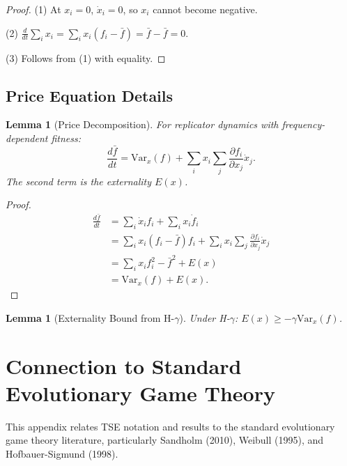 \documentclass[12pt]{article}
\newtheorem{lemma}[theorem]{Lemma}
\newcommand{\Var}{\mathrm{Var}}
\begin{document}
\begin{proof}
(1) At $x_i = 0$, $\dot{x}_i = 0$, so $x_i$ cannot become negative.

(2) $\frac{d}{dt} \sum_i x_i = \sum_i x_i (f_i - \bar{f}) = \bar{f} - \bar{f} = 0$.

(3) Follows from (1) with equality.
\end{proof}

\subsection{Price Equation Details}

\begin{lemma}[Price Decomposition]
\label{lem:price-decomp}
For replicator dynamics with frequency-dependent fitness:
\[
\frac{d\bar{f}}{dt} = \Var_x(f) + \sum_i x_i \sum_j \frac{\partial f_i}{\partial x_j} \dot{x}_j.
\]
The second term is the externality $E(x)$.
\end{lemma}

\begin{proof}
\begin{align*}
\frac{d\bar{f}}{dt} &= \sum_i \dot{x}_i f_i + \sum_i x_i \dot{f}_i \\
&= \sum_i x_i (f_i - \bar{f}) f_i + \sum_i x_i \sum_j \frac{\partial f_i}{\partial x_j} \dot{x}_j \\
&= \sum_i x_i f_i^2 - \bar{f}^2 + E(x) \\
&= \Var_x(f) + E(x).
\end{align*}
\end{proof}

\begin{lemma}[Externality Bound from H-$\gamma$]
\label{lem:externality-bound}
Under H-$\gamma$: $E(x) \geq -\gamma \Var_x(f)$.
\end{lemma}


\section{Connection to Standard Evolutionary Game Theory}
\label{app:egt}

This appendix relates TSE notation and results to the standard evolutionary game theory literature, particularly Sandholm (2010), Weibull (1995), and Hofbauer-Sigmund (1998).
\end{document}
